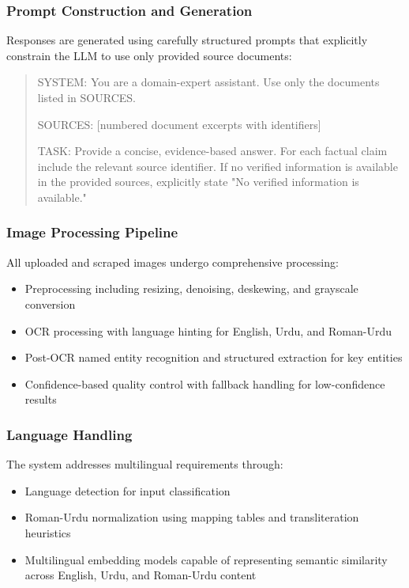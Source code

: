 \subsubsection{Prompt Construction and Generation}

Responses are generated using carefully structured prompts that explicitly constrain the LLM to use only provided source documents:

\begin{quote}
SYSTEM: You are a domain-expert assistant. Use only the documents listed in SOURCES.

SOURCES: [numbered document excerpts with identifiers]

TASK: Provide a concise, evidence-based answer. For each factual claim include the relevant source identifier. If no verified information is available in the provided sources, explicitly state "No verified information is available."
\end{quote}

\subsubsection{Image Processing Pipeline}

All uploaded and scraped images undergo comprehensive processing:

\begin{itemize}\setlength{\itemsep}{0pt}
    \item Preprocessing including resizing, denoising, deskewing, and grayscale conversion
    \item OCR processing with language hinting for English, Urdu, and Roman-Urdu
    \item Post-OCR named entity recognition and structured extraction for key entities
    \item Confidence-based quality control with fallback handling for low-confidence results
\end{itemize}

\subsubsection{Language Handling}

The system addresses multilingual requirements through:

\begin{itemize}\setlength{\itemsep}{0pt}
    \item Language detection for input classification
    \item Roman-Urdu normalization using mapping tables and transliteration heuristics
    \item Multilingual embedding models capable of representing semantic similarity across English, Urdu, and Roman-Urdu content
\end{itemize}

